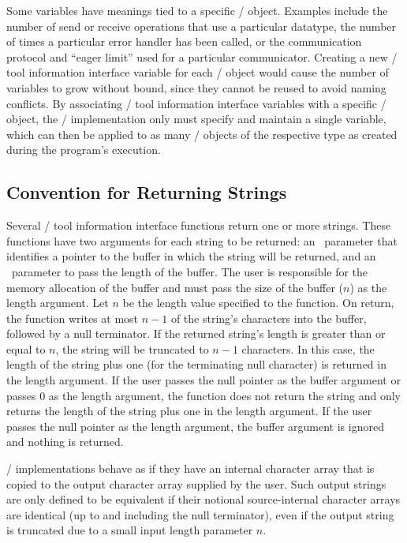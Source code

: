 \begin{rationale}
Some variables have meanings tied to a specific \MPI/ object.  Examples
include the number of send or receive operations that use a particular
datatype, the number of times a particular error handler has been called,
or the communication protocol and ``eager limit'' used for a particular
communicator.  Creating a new \MPI/ tool information interface variable for
each \MPI/ object would cause the number of variables to grow without
bound, since they cannot be reused to avoid naming conflicts.  By
associating \MPI/ tool information interface variables with a specific
\MPI/ object, the \MPI/ implementation only must specify and maintain a
single variable, which can then be applied to as many \MPI/ objects of the
respective type as created during the program's execution.
\end{rationale}



\subsection{Convention for Returning Strings}
\label{sec:mpit:strings}

Several \MPI/ tool information interface functions return one or more
strings.  These functions have two arguments for each string to be
returned: an \OUT\ parameter that identifies a pointer to the buffer in
which the string will be returned, and an \INOUT\ parameter to pass the
length of the buffer.  The user is responsible for the memory allocation of
the buffer and must pass the size of the buffer ($n$) as the length
argument.  Let $n$ be the length value specified to the function.  On
return, the function writes at most $n-1$ of the string's characters into
the buffer, followed by a null terminator.  If the returned string's length
is greater than or equal to $n$, the string will be truncated to $n-1$
characters.  In this case, the length of the string plus one (for the
terminating null character) is returned in the length argument.  If the
user passes the null pointer as the buffer argument or passes 0 as the
length argument, the function does not return the string and only returns
the length of the string plus one in the length argument.  If the user
passes the null pointer as the length argument, the buffer argument is
ignored and nothing is returned.

\MPI/ implementations behave as if they have an internal character array
that is copied to the output character array supplied by the user.  Such
output strings are only defined to be equivalent if their notional
source-internal character arrays are identical (up to and including the
null terminator), even if the output string is truncated due to a small
input length parameter $n$.



